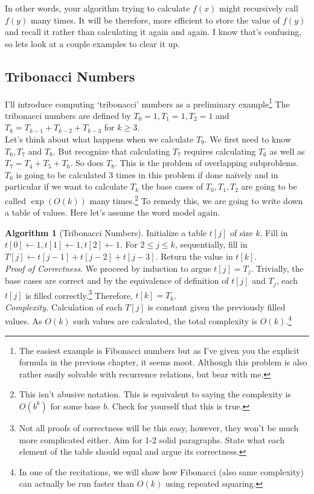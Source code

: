 \documentclass[10pt]{article}
\theoremstyle{plain}
\theoremstyle{definition}
\newtheorem{alg}[thm]{Algorithm}
\numberwithin{equation}{section}
\numberwithin{figure}{section}
\begin{document}
\noindent \noindent In other words, your algorithm trying to calculate $f(x)$ might recursively call $f(y)$ many times. It will be therefore, more efficient to store the value of $f(y)$ and recall it rather than calculating it again and again. I know that's confusing, so lets look at a couple examples to clear it up. 

\subsection{Tribonacci Numbers}
\noindent I'll introduce computing `tribonacci' numbers as a preliminary example\footnote{The easiest example is Fibonacci numbers but as I've given you the explicit formula in the previous chapter, it seems moot. Although this problem is also rather easily solvable with recurrence relations, but bear with me.} The tribonacci numbers are defined by $T_0 = 1, T_1 = 1, T_2 = 1$ and $T_k = T_{k -1} + T_{k-2} + T_{k - 3}$ for $k \geq 3$. \\

\noindent Let's think about what happens when we calculate $T_9$. We first need to know $T_6, T_7$ and $T_8$. But recognize that calculating $T_7$ requires calculating $T_6$ as well as $T_7 = T_4 + T_5 + T_6$. So does $T_8$. This is the problem of overlapping subproblems. $T_6$ is going to be calculated 3 times in this problem if done na\"ively and in particular if we want to calculate $T_k$ the base cases of $T_0, T_1, T_2$ are going to be called $\exp(O(k))$ many times.\footnote{This isn't abusive notation. This is equivalent to saying the complexity is $O(b^k)$ for some base $b$. Check for yourself that this is true.} To remedy this, we are going to write down a table of values. Here let's assume the word model again.

\begin{alg}[Tribonacci Numbers]
Initialize a table $t[j]$ of size $k$. Fill in $t[0] \leftarrow 1, t[1] \leftarrow 1, t[2] \leftarrow 1$. For $2 \leq j \leq k$, sequentially, fill in $T[j] \leftarrow t[j-1] + t[j-2] + t[j-3]$. Return the value in $t[k]$. \\

\noindent \textit{Proof of Correctness}. We proceed by induction to argue $t[j] = T_j$. Trivially, the base cases are correct and by the equivalence of definition of $t[j]$ and $T_j$, each $t[j]$ is filled correctly.\footnote{Not all proofs of correctness will be this easy, however, they won't be much more complicated either. Aim for 1-2 solid paragraphs. State what each element of the table should equal and argue its correctness.} Therefore, $t[k] = T_k$. \\

\noindent \textit{Complexity.} Calculation of each $T[j]$ is constant given the previously filled values. As $O(k)$ such values are calculated, the total complexity is $O(k)$.\footnote{In one of the recitations, we will show how Fibonacci (also same complexity) can actually be run faster than $O(k)$ using repeated squaring.}
\end{alg}
\end{document}

